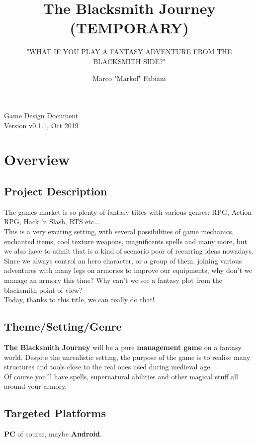 \documentclass[a4paper]{scrreprt}
\title{The Blacksmith Journey (TEMPORARY)}
\subtitle{"WHAT IF YOU PLAY A FANTASY ADVENTURE FROM THE BLACKSMITH SIDE?"}
\author{Marco "Markof" Fabiani}
\begin{document}
\maketitle

\null\vfill
\noindent
Game Design Document\\ 
Version v0.1.1, Oct 2019\\
\newpage


\tableofcontents

\chapter{Overview}

\section{Project Description}
The games market is so plenty of fantasy titles with various genres: RPG, Action RPG, Hack 'n Slash, RTS etc...\\
This is a very exciting setting, with several possibilities of game mechanics, enchanted items, cool texture weapons, magnificents spells and many more, but we also have to admit that is a kind of scenario 
poor of recurring ideas nowadays.\\
Since we always control an hero character, or a group of them, joining various adventures with many legs on armories to improve our equipments, why don't we manage an armory this time? Why can't we see a fantasy plot from the blacksmith point of view?\\
Today, thanks to this title, we can really do that! 

\section{Theme/Setting/Genre}
\textbf{The Blacksmith Journey} will be a pure \textbf{management game} on a fantasy world. Despite the unrealistic setting, the purpose of the game is to realise many structures and tools close to the real ones used during medieval age.\\
Of course you'll have spells, supernatural abilities and other magical stuff all around your armory.

\section{Targeted Platforms}
\textbf{PC} of course, maybe \textbf{Android}.
\end{document}
